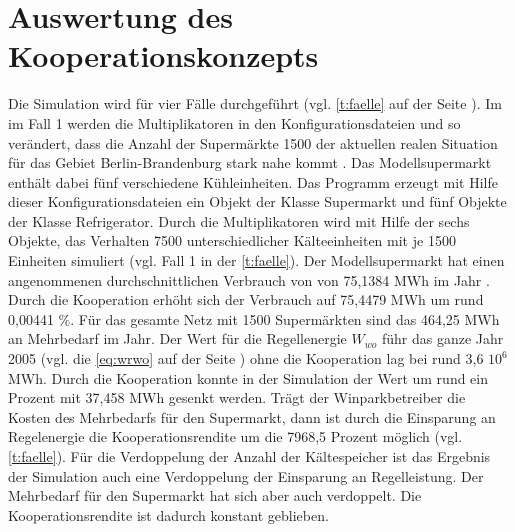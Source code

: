 \section{Auswertung des Kooperationskonzepts}
Die Simulation wird f\"ur vier F\"alle durchgef\"uhrt (vgl. \cref{t:faelle} auf
der Seite \pageref{t:faelle}). Im im Fall 1 werden die Multiplikatoren in den
Konfigurationsdateien  und  so ver\"andert, dass
die Anzahl der Superm\"arkte 1500 der aktuellen realen Situation f\"ur das
Gebiet Berlin-Brandenburg stark nahe kommt \cite{caro}. Das Modellsupermarkt
enth\"alt dabei f\"unf verschiedene K\"uhleinheiten. Das Programm erzeugt mit
Hilfe dieser Konfigurationsdateien ein Objekt der Klasse Supermarkt und f\"unf
Objekte der Klasse Refrigerator. Durch die Multiplikatoren wird mit Hilfe der
sechs Objekte, das Verhalten 7500 unterschiedlicher K\"alteeinheiten mit je 1500
Einheiten simuliert (vgl. Fall 1 in der \cref{t:faelle}). Der Modellsupermarkt
hat einen angenommenen durchschnittlichen Verbrauch von von 75,1384 MWh im Jahr
\cite{caro}. Durch die Kooperation erh\"oht sich der Verbrauch auf 75,4479 MWh
um rund 0,00441 $\%$.  F\"ur das gesamte Netz mit 1500 Superm\"arkten sind das
464,25 MWh an Mehrbedarf im Jahr. Der Wert f\"ur die Regellenergie $W_{wo}$
f\"uhr das ganze Jahr 2005 (vgl. die \cref{eq:wrwo} auf der Seite
\pageref{eq:wrwo}) ohne die Kooperation lag bei rund 3,6 $10^6$ MWh. Durch die
Kooperation konnte in der Simulation der Wert um rund ein Prozent mit 37,458 MWh
gesenkt werden. Tr\"agt der Winparkbetreiber die Kosten des Mehrbedarfs
f\"ur den Supermarkt, dann ist durch die Einsparung an Regelenergie die
Kooperationsrendite um die 7968,5 Prozent m\"oglich (vgl. \cref{t:faelle}).
F\"ur die Verdoppelung der Anzahl der K\"altespeicher ist das Ergebnis der
Simulation auch eine Verdoppelung der Einsparung an Regelleistung. Der
Mehrbedarf f\"ur den Supermarkt hat sich aber auch verdoppelt. Die
Kooperationsrendite ist dadurch konstant geblieben.

